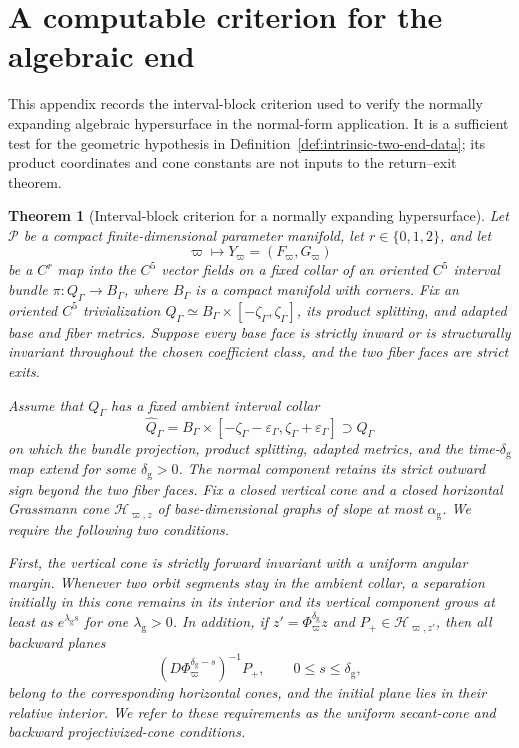 \documentclass[11pt]{amsart}
\numberwithin{equation}{section}
\newtheorem{theorem}{Theorem}[section]
\theoremstyle{definition}
\theoremstyle{remark}
\begin{document}
\appendix

\section{A computable criterion for the algebraic end}
\label{app:algebraic-interval-criterion}

This appendix records the interval-block criterion used to verify the
normally expanding algebraic hypersurface in the normal-form application.
It is a sufficient test for the geometric hypothesis in
Definition~\ref{def:intrinsic-two-end-data}; its product coordinates and
cone constants are not inputs to the return--exit theorem.

\begin{theorem}[Interval-block criterion for a normally expanding
hypersurface]
\label{thm:algebraic-corridor-graph}
Let $\mathcal P$ be a compact finite-dimensional parameter manifold, let
$r\in\{0,1,2\}$, and let
\begin{equation}\label{eq:corridor-field-family}
 \varpi\longmapsto Y_\varpi=(F_\varpi,G_\varpi)
\end{equation}
be a $C^r$ map into the $C^5$ vector fields on a fixed collar of an
oriented $C^5$ interval bundle $\pi:Q_\Gamma\to B_\Gamma$, where
$B_\Gamma$ is a compact manifold with corners.  Fix an oriented $C^5$
trivialization $Q_\Gamma\simeq
B_\Gamma\times[-\zeta_\Gamma,\zeta_\Gamma]$, its product splitting, and
adapted base and fiber metrics.  Suppose every base face is
strictly inward or is structurally invariant throughout the chosen
coefficient class, and the two fiber faces are strict exits.

Assume that $Q_\Gamma$ has a fixed ambient interval collar
\[
 \widehat Q_\Gamma=
 B_\Gamma\times[-\zeta_\Gamma-\varepsilon_\Gamma,
                 \zeta_\Gamma+\varepsilon_\Gamma]
 \supset Q_\Gamma
\]
on which the bundle projection, product splitting, adapted metrics, and
the time-$\delta_{\mathrm g}$ map extend for some
$\delta_{\mathrm g}>0$.  The normal component retains its strict outward
sign beyond the two fiber faces.  Fix a closed vertical cone and a closed
horizontal Grassmann cone $\mathcal H_{\varpi,z}$ of base-dimensional
graphs of slope at most $\alpha_{\mathrm g}$.  We require the following
two conditions.

First, the vertical cone is strictly forward invariant with a uniform
angular margin.  Whenever two orbit segments stay in the ambient collar,
a separation initially in this cone remains in its interior and its
vertical component grows at least as $e^{\lambda_{\mathrm g}s}$ for one
$\lambda_{\mathrm g}>0$.  In addition, if
$z'=\Phi_\varpi^{\delta_{\mathrm g}}z$ and
$P_+\in\mathcal H_{\varpi,z'}$, then all backward planes
\[
 (D\Phi_\varpi^{\delta_{\mathrm g}-s})^{-1}P_+,
 \qquad 0\le s\le\delta_{\mathrm g},
\]
belong to the corresponding horizontal cones, and the initial plane lies
in their relative interior.  We refer to these requirements as the
uniform secant-cone and backward projectivized-cone conditions.


\end{theorem}
\end{document}
